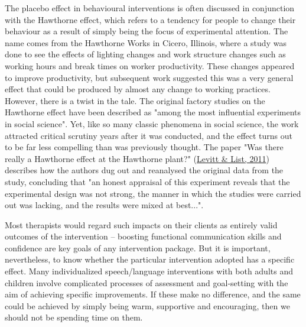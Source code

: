 \documentclass{krantz}
\begin{document}
\begin{tcolorbox}[colback=Black!5!lightgray,colframe=black!75!black,coltitle=white,title=The Hawthorne Effect]\label{box:Hawthorne}
The placebo effect in behavioural interventions is often discussed in conjunction with the Hawthorne effect, which refers to a tendency for people to change their behaviour as a result of simply being the focus of experimental attention. The name comes from the Hawthorne Works in Cicero, Illinois, where a study was done to see the effects of lighting changes and work structure changes such as working hours and break times on worker productivity. These changes appeared to improve productivity, but subsequent work suggested this was a very general effect that could be produced by almost any change to working practices. However, there is a twist in the tale. The original factory studies on the Hawthorne effect have been described as "among the most influential experiments in social science". Yet, like so many classic phenomena in social science, the work attracted critical scrutiny years after it was conducted, and the effect turns out to be far less compelling than was previously thought. The paper "Was there really a Hawthorne effect at the Hawthorne plant?" (\protect\hyperlink{ref-levitt2011}{Levitt \& List, 2011}) describes how the authors dug out and reanalysed the original data from the study, concluding that "an honest appraisal of this experiment reveals that the experimental design was not strong, the manner in which the studies were carried out was lacking, and the results were mixed at best...".
\end{tcolorbox}

Most therapists would regard such impacts on their clients as entirely valid outcomes of the intervention -- boosting functional communication skills and confidence are key goals of any intervention package. But it is important, nevertheless, to know whether the particular intervention adopted has a specific effect. Many individualized speech/language interventions with both adults and children involve complicated processes of assessment and goal-setting with the aim of achieving specific improvements. If these make no difference, and the same could be achieved by simply being warm, supportive and encouraging, then we should not be spending time on them.
\end{document}
